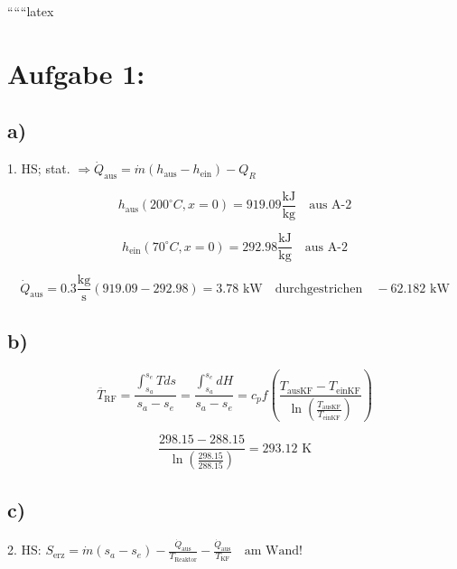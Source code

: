 
``````latex


\section*{Aufgabe 1:}

\subsection*{a)}
1. HS; stat. $\Rightarrow \dot{Q}_{\text{aus}} = \dot{m} (h_{\text{aus}} - h_{\text{ein}}) - Q_R$

\[
h_{\text{aus}} (200^\circ C, x=0) = 919.09 \frac{\text{kJ}}{\text{kg}} \quad \text{aus A-2}
\]

\[
h_{\text{ein}} (70^\circ C, x=0) = 292.98 \frac{\text{kJ}}{\text{kg}} \quad \text{aus A-2}
\]

\[
\dot{Q}_{\text{aus}} = 0.3 \frac{\text{kg}}{\text{s}} (919.09 - 292.98) = 3.78 \text{ kW} \quad \text{durchgestrichen} \quad -62.182 \text{ kW}
\]

\subsection*{b)}
\[
\overline{T}_{\text{RF}} = \frac{\int_{s_a}^{s_e} T ds}{s_a - s_e} = \frac{\int_{s_a}^{s_e} dH}{s_a - s_e} = c_p f \left( \frac{T_{\text{ausKF}} - T_{\text{einKF}}}{\ln \left( \frac{T_{\text{ausKF}}}{T_{\text{einKF}}} \right)} \right)
\]

\[
\frac{298.15 - 288.15}{\ln \left( \frac{298.15}{288.15} \right)} = 293.12 \text{ K}
\]

\subsection*{c)}
2. HS: $S_{\text{erz}} = \dot{m} (s_a - s_e) - \frac{\dot{Q}_{\text{aus}}}{T_{\text{Reaktor}}} - \frac{\dot{Q}_{\text{aus}}}{T_{\text{KF}}} \quad \text{am Wand!}$

